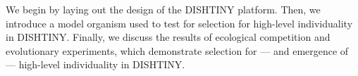 We begin by laying out the design of the DISHTINY platform.
Then, we introduce a model organism used to test for selection for high-level individuality in DISHTINY.
Finally, we discuss the results of ecological competition and evolutionary experiments, which demonstrate selection for --- and emergence of --- high-level individuality in DISHTINY.
